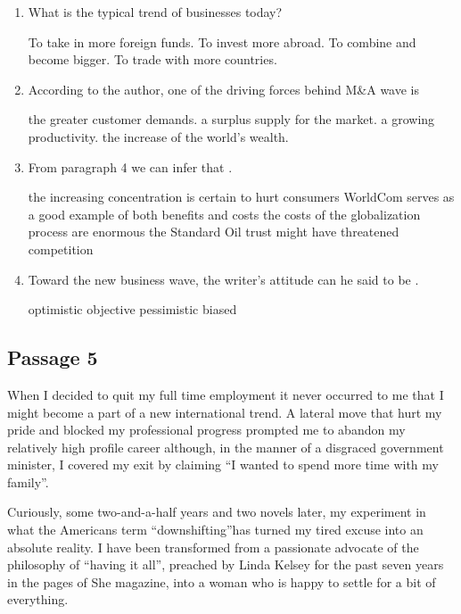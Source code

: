 \begin{enumerate}[resume]
	\item
What is the typical trend of businesses today?


\fourchoices
{To take in more foreign funds.}
{To invest more abroad.}
{To combine and become bigger.}
{To trade with more countries.}


\item
According to the author, one of the driving forces behind M\&A wave
is \lineread


\fourchoices
{the greater customer demands.}
{a surplus supply for the market.}
{a growing productivity.}
{the increase of the world's wealth.}


\item
From paragraph 4 we can infer that \lineread.


\fourchoices
{the increasing concentration is certain to hurt consumers}
{WorldCom serves as a good example of both benefits and costs}
{the costs of the globalization process are enormous}
{the Standard Oil trust might have threatened competition}



\item
Toward the new business wave, the writer's attitude can he said to
be \lineread.


\fourchoices
{optimistic}
{objective}
{pessimistic}
{biased}

	
\end{enumerate}



\newpage
\subsection{Passage 5}

When I decided to quit my full time employment it never occurred to me
that I might become a part of a new international trend. A lateral move
that hurt my pride and blocked my professional progress prompted me to
abandon my relatively high profile career although, in the manner of a
disgraced government minister, I covered my exit by claiming ``I wanted
to spend more time with my family''.

Curiously, some two-and-a-half years and two novels later, my experiment
in what the Americans term ``downshifting''has turned my tired excuse
into an absolute reality. I have been transformed from a passionate
advocate of the philosophy of ``having it all'', preached by Linda
Kelsey for the past seven years in the pages of She magazine, into a
woman who is happy to settle for a bit of everything.

